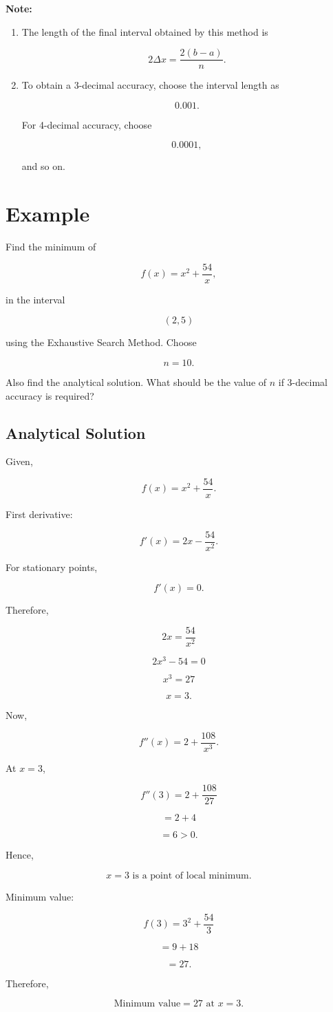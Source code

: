 \documentclass{article}
\begin{document}
\textbf{Note:}

\begin{enumerate}
    \item The length of the final interval obtained by this method is

    \[
    2\Delta x
    =\frac{2(b-a)}{n}.
    \]

    \item To obtain a 3-decimal accuracy, choose the interval length as

    \[
    0.001.
    \]

    For 4-decimal accuracy, choose

    \[
    0.0001,
    \]

    and so on.
\end{enumerate}

\hrulefill

\section*{Example}

Find the minimum of

\[
f(x)=x^2+\frac{54}{x},
\]

in the interval

\[
(2,5)
\]

using the Exhaustive Search Method. Choose

\[
n=10.
\]

Also find the analytical solution. What should be the value of \(n\) if 3-decimal accuracy is required?

\subsection*{Analytical Solution}

Given,

\[
f(x)=x^2+\frac{54}{x}.
\]

First derivative:

\[
f'(x)=2x-\frac{54}{x^2}.
\]

For stationary points,

\[
f'(x)=0.
\]

Therefore,

\[
2x=\frac{54}{x^2}
\]

\[
2x^3-54=0
\]

\[
x^3=27
\]

\[
\boxed{x=3.}
\]

Now,

\[
f''(x)=2+\frac{108}{x^3}.
\]

At \(x=3\),

\[
f''(3)=2+\frac{108}{27}
\]

\[
=2+4
\]

\[
=6>0.
\]

Hence,

\[
\boxed{x=3 \text{ is a point of local minimum}.}
\]

Minimum value:

\[
f(3)=3^2+\frac{54}{3}
\]

\[
=9+18
\]

\[
=27.
\]

Therefore,

\[
\boxed{\text{Minimum value}=27 \text{ at } x=3.}
\]
\end{document}
